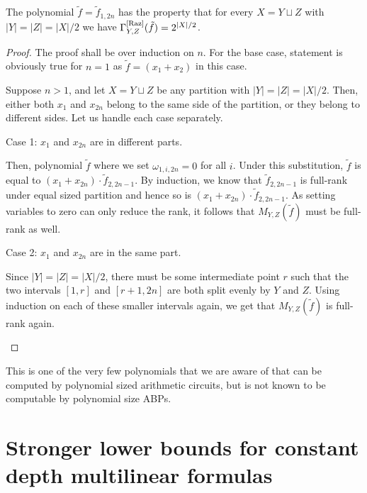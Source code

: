 \begin{lemma}[\cite{ry08}]
The polynomial $\tilde{f} = \tilde{f}_{1,2n}$ has the property that for every $X = Y \sqcup Z$ with $|Y| = |Z| = |X|/2$ we have $\Gamma^{\mathrm{[Raz]}}_{Y,Z}(\tilde{f}) = 2^{|X|/2}$. 
\end{lemma}
\begin{proof}
The proof shall be over induction on $n$. For the base case, statement is obviously true for $n = 1$ as $\tilde{f} = (x_1 + x_2)$ in this case. 

Suppose $n > 1$, and let $X = Y \sqcup Z$ be any partition with $|Y| = |Z| = |X|/2$. Then, either both $x_1$ and $x_{2n}$ belong to the same side of the partition, or they belong to different sides. Let us handle each case separately. 

\begin{description}
\item{Case 1:  $x_1$ and $x_{2n}$ are in different parts}. 

Then, polynomial $\tilde{f}$ where we set $\omega_{1,i,2n} = 0$ for all $i$. Under this substitution, $\tilde{f}$ is equal to $(x_1 + x_{2n})\cdot \tilde{f}_{2,2n-1}$. By induction, we know that $\tilde{f}_{2,2n-1}$ is full-rank under equal sized partition and hence so is $(x_1 + x_{2n}) \cdot \tilde{f}_{2,2n-1}$. As setting variables to zero can only reduce the rank, it follows that $M_{Y,Z}(\tilde{f})$ must be full-rank as well. 

\item{Case 2:  $x_1$ and $x_{2n}$ are in the same part}. 

Since $|Y| = |Z| = |X|/2$, there must be some intermediate point $r$ such that the two intervals $[1,r]$ and $[r+1,2n]$ are both split evenly by $Y$ and $Z$. Using induction on each of these smaller intervals again, we get that $M_{Y,Z}(\tilde{f})$ is full-rank again. 
\end{description}
\end{proof}

This is one of the very few polynomials that we are aware of that can be computed by polynomial sized arithmetic circuits, but is not known to be computable by polynomial size ABPs. 

\section{Stronger lower bounds for constant depth multilinear formulas}

